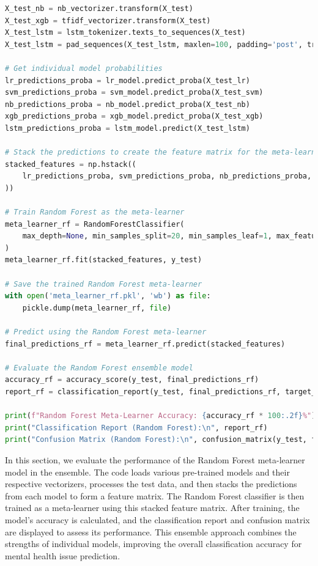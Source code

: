\begin{tcolorbox}[colback=gray!5!white, colframe=gray!80!black, boxrule=0.5pt, title=Evaluate Meta-Learner and Ensemble Model 3]
    \begin{lstlisting}[language=Python]
X_test_nb = nb_vectorizer.transform(X_test)
X_test_xgb = tfidf_vectorizer.transform(X_test)
X_test_lstm = lstm_tokenizer.texts_to_sequences(X_test)
X_test_lstm = pad_sequences(X_test_lstm, maxlen=100, padding='post', truncating='post')

# Get individual model probabilities
lr_predictions_proba = lr_model.predict_proba(X_test_lr)
svm_predictions_proba = svm_model.predict_proba(X_test_svm)
nb_predictions_proba = nb_model.predict_proba(X_test_nb)
xgb_predictions_proba = xgb_model.predict_proba(X_test_xgb)
lstm_predictions_proba = lstm_model.predict(X_test_lstm)

# Stack the predictions to create the feature matrix for the meta-learner
stacked_features = np.hstack((
    lr_predictions_proba, svm_predictions_proba, nb_predictions_proba, xgb_predictions_proba, lstm_predictions_proba
))

# Train Random Forest as the meta-learner
meta_learner_rf = RandomForestClassifier(
    max_depth=None, min_samples_split=20, min_samples_leaf=1, max_features='sqrt', bootstrap=False, random_state=42           
)
meta_learner_rf.fit(stacked_features, y_test)

# Save the trained Random Forest meta-learner
with open('meta_learner_rf.pkl', 'wb') as file:
    pickle.dump(meta_learner_rf, file)

# Predict using the Random Forest meta-learner
final_predictions_rf = meta_learner_rf.predict(stacked_features)

# Evaluate the Random Forest ensemble model
accuracy_rf = accuracy_score(y_test, final_predictions_rf)
report_rf = classification_report(y_test, final_predictions_rf, target_names=label_encoder.classes_)

print(f"Random Forest Meta-Learner Accuracy: {accuracy_rf * 100:.2f}%")
print("Classification Report (Random Forest):\n", report_rf)
print("Confusion Matrix (Random Forest):\n", confusion_matrix(y_test, final_predictions_rf))
    \end{lstlisting}
\end{tcolorbox}

\noindent
In this section, we evaluate the performance of the Random Forest meta-learner model in the ensemble. The code loads various pre-trained models and their respective vectorizers, processes the test data, and then stacks the predictions from each model to form a feature matrix. The Random Forest classifier is then trained as a meta-learner using this stacked feature matrix. After training, the model's accuracy is calculated, and the classification report and confusion matrix are displayed to assess its performance. This ensemble approach combines the strengths of individual models, improving the overall classification accuracy for mental health issue prediction.


